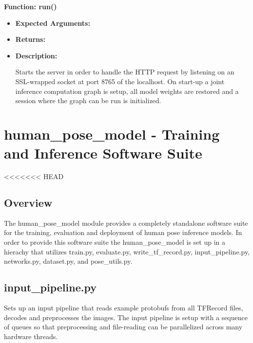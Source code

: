 \documentclass{scrreprt}
\begin{document}
\textbf{Function: run()}
\begin{itemize}
    \item \textbf{Expected Arguments:}

    \item \textbf{Returns:}

    \item \textbf{Description:}

            Starts the server in order to handle the HTTP request by listening
                on an SSL-wrapped socket at port 8765 of the localhost. On
                start-up a joint inference computation graph is setup, all
                model weights are restored and a session where the graph can be
                run is initialized.

\end{itemize}

\section{human\_pose\_model - Training and Inference Software Suite}

<<<<<<< HEAD
\subsection{Overview}
The human\_pose\_model module provides a completely standalone software suite for the training, evaluation and deployment of human pose inference models. In order to provide this software suite the human\_pose\_model is set up in a hierachy that utilizes train.py, evaluate.py, write_tf_record.py, input_pipeline.py, networks.py, dataset.py, and pose_utils.py.

\subsection{input_pipeline.py}
Sets up an input pipeline that reads example protobufs from all TFRecord files, decodes and preprocesses the images. The input pipeline is setup with a sequence of queues so that preprocessing and file-reading can be parallelized across many hardware threads.
\end{document}
